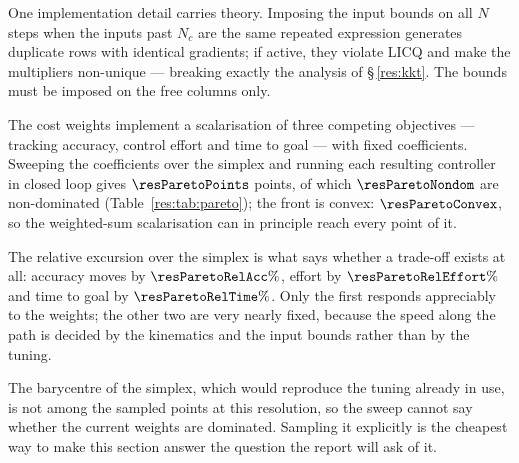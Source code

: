 One implementation detail carries theory. Imposing the input bounds on all $N$ steps when the inputs past $N_c$ are the same repeated expression generates duplicate rows with identical gradients; if active, they violate LICQ and make the multipliers non-unique --- breaking exactly the analysis of \S\,\ref{res:kkt}. The bounds must be imposed on the free columns only.

\begin{table}[htbp]
  \centering
  \small
  \caption{Closed-loop outcome against the control horizon at fixed prediction horizon.}
  \label{res:tab:nc}
\end{table}

\label{res:pareto}


The cost weights implement a scalarisation of three competing objectives --- tracking accuracy, control effort and time to goal --- with fixed coefficients. Sweeping the coefficients over the simplex and running each resulting controller in closed loop gives $\resParetoPoints$ points, of which $\resParetoNondom$ are non-dominated (Table~\ref{res:tab:pareto}); the front is convex: $\resParetoConvex$, so the weighted-sum scalarisation can in principle reach every point of it.

The relative excursion over the simplex is what says whether a trade-off exists at all: accuracy moves by $\resParetoRelAcc\%$, effort by $\resParetoRelEffort\%$ and time to goal by $\resParetoRelTime\%$. Only the first responds appreciably to the weights; the other two are very nearly fixed, because the speed along the path is decided by the kinematics and the input bounds rather than by the tuning.

The barycentre of the simplex, which would reproduce the tuning already in use, is not among the sampled points at this resolution, so the sweep cannot say whether the current weights are dominated. Sampling it explicitly is the cheapest way to make this section answer the question the report will ask of it.

\begin{table}[htbp]
  \centering
  \small
  \caption{Closed-loop outcome of each scalarisation of the three objectives. Bold: non-dominated points.}
  \label{res:tab:pareto}
\end{table}

